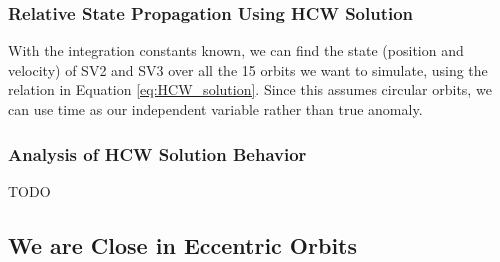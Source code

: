 \subsubsection{Relative State Propagation Using HCW Solution}

With the integration constants known, we can find the state (position and velocity) of SV2 and SV3 over all the 15 orbits we want to simulate, using the relation in Equation \ref{eq:HCW_solution}. Since this assumes circular orbits, we can use time as our independent variable rather than true anomaly.



\subsubsection{Analysis of HCW Solution Behavior}

TODO

\subsection{We are Close in Eccentric Orbits}